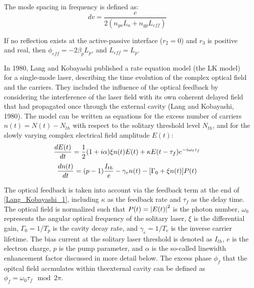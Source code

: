 The mode spacing in frequency is defined as:
\begin{equation}
    dv=\frac{c}{2(n_{ga}L_a+n_{gp}L_{eff})}
    \label{mode_spacing}
\end{equation}

If no reflection exists at the active-passive interface ($r_2=0$) and $r_3$ is positive and real, then $\phi_{eff}=-2\beta_pL_p$, and $L_{eff}=L_p$.



In 1980, Lang and Kobayashi published a rate equation model (the LK model) for a single-mode laser, describing the time evolution of the complex optical field and the carriers. They included the influence of the optical feedback by considering the interference of the laser field with its own coherent delayed field that had propagated once through the external cavity (Lang and Kobayashi, 1980). The model can be written as equations for the excess number of carriers $n(t)=N(t)-N_{th}$ with respect to the solitary threshold level $N_{th}$, and for the slowly varying complex electrical field amplitude $E(t)$:
\begin{equation}
    \label{Lang_Kobayashi_1}
    \dv{E(t)}{t}=\frac{1}{2}\qty(1+i\alpha)\xi n(t)E(t)+\kappa E\qty(t-\tau_f)e^{-i\omega_0\tau_f}
\end{equation}
\begin{equation}
    \label{Lang_Kobayashi_2}
    \dv{n(t)}{t}=\qty(p-1)\frac{I_{th}}{e}-\gamma_e n(t)-\qty[\Gamma_0+\xi n(t)]P(t)
\end{equation}

The optical feedback is taken into account via the feedback term at the end of \autoref{Lang_Kobayashi_1}, including $\kappa$ as the feedback rate and $\tau_f$ as the delay time. The optical field is normalized such that $P(t)=\abs{E(t)}^2$ is the photon number, $\omega_0$ represents the angular optical frequency of the solitary laser, $\xi$ is the differential gain, $\Gamma_0=1/T_p$ is the cavity decay rate, and $\gamma_e=1/T_e$ is the inverse carrier lifetime. The bias current at the solitary laser threshold is denoted as $I_{th}$, $e$ is the electron charge, $p$ is the pump parameter, and $\alpha$ is the so-called linewidth enhancement factor discussed in more detail below. The excess phase $\phi_f$ that the opitcal field accmulates within theexternal cavity can be defined as $\phi_f=\omega_0\tau_f\mod2\pi$.



